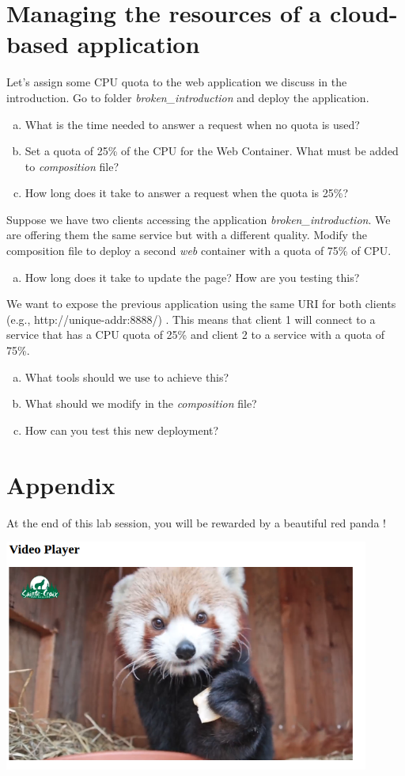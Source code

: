 \documentclass[a4paper,11pt]{exam}
\begin{document}
\section{Managing the resources of a cloud-based application}
\begin{questions}
	\question Let's assign some CPU quota to the web application we discuss in the introduction. Go to folder \textit{broken\_introduction} and deploy the application.
	
	\begin{enumerate}[(a)] %
		\item What is the time needed to answer a request when no quota is used?
		\item Set a quota of 25\% of the CPU for the Web Container. What must be added to \textit{composition} file? 
		\item How long does it take to answer a request when the quota is 25\%?
	\end{enumerate}
	
	\question Suppose we have two clients accessing the application \textit{broken\_introduction}. We are offering them the same service but with a different quality. Modify the composition file to deploy a second \textit{web} container with a quota of 75\% of CPU.
	
	\begin{enumerate}[(a)] %
	 	\item How long does it take to update the page? How are you testing this?
	\end{enumerate}
	
	\question We want to expose the previous application using the same URI for both clients (e.g., http://unique-addr:8888/) . This means that client 1 will connect to a service that has a CPU quota of 25\% and client 2 to a service with a quota of 75\%.
	 
	\begin{enumerate}[(a)] %
		\item What tools should we use to achieve this?
		\item What should we modify in the \textit{composition} file?
		\item How can you test this new deployment?
	\end{enumerate}
	
\end{questions}

\section{Appendix}

At the end of this lab session, you will be rewarded by a beautiful red panda !
\begin{center}
	\includegraphics[width=12cm]{fig/redpanda.png}	
\end{center}
\end{document}
